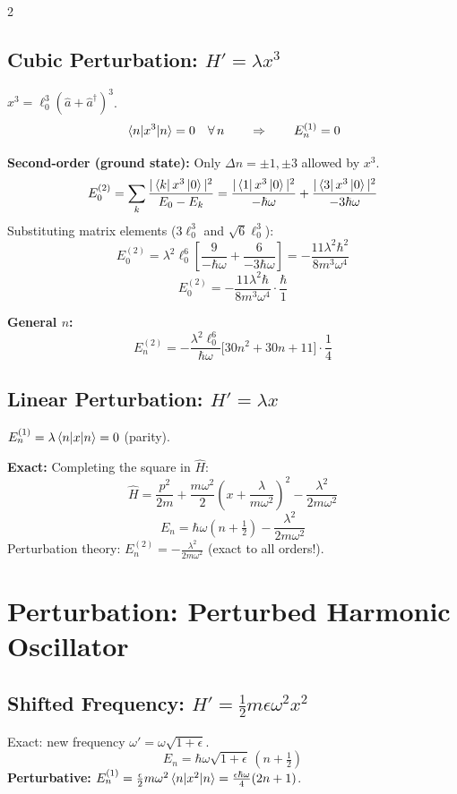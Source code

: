 \documentclass[9pt,a4paper]{article} %
\newcommand{\Hhat}{\hat{H}}
\newcommand{\aop}{\hat{a}}
\newcommand{\adop}{\hat{a}^\dagger}
\begin{document}
\begin{multicols}{2}
\subsection{Cubic Perturbation: $H' = \lambda x^3$}
$x^3 = \ell_0^3(\aop + \adop)^3$.
\[
\ev{x^3}{n} = 0 \quad\forall\,n \qquad\Rightarrow\qquad E_n^{(1)} = 0
\]

\textbf{Second-order (ground state):}
Only $\Delta n = \pm 1, \pm 3$ allowed by $x^3$.
\[
E_0^{(2)} = \sum_{k} \frac{|\bra{k}x^3\ket{0}|^2}{E_0 - E_k} = \frac{|\bra{1}x^3\ket{0}|^2}{-\hbar\omega} + \frac{|\bra{3}x^3\ket{0}|^2}{-3\hbar\omega}
\]
Substituting matrix elements ($3\ell_0^3$ and $\sqrt{6}\ell_0^3$):
\[
E_0^{(2)} = \lambda^2 \ell_0^6 \left[ \frac{9}{-\hbar\omega} + \frac{6}{-3\hbar\omega} \right] = -\frac{11\lambda^2\hbar^2}{8m^3\omega^4}
\]
\[
\boxed{E_0^{(2)} = -\frac{11\lambda^2\hbar}{8m^3\omega^4} \cdot \frac{\hbar}{1}}
\]

\textbf{General $n$:}
\[
E_n^{(2)} = -\frac{\lambda^2 \ell_0^6}{\hbar\omega}\bigl[30n^2 + 30n + 11\bigr] \cdot \frac{1}{4}
\]

\subsection{Linear Perturbation: $H' = \lambda x$}
$E_n^{(1)} = \lambda\ev{x}{n} = 0$ (parity).

\textbf{Exact:} Completing the square in $\Hhat$:
\[
\Hhat = \frac{p^2}{2m} + \frac{m\omega^2}{2}\!\left(x + \frac{\lambda}{m\omega^2}\right)^2 - \frac{\lambda^2}{2m\omega^2}
\]
\[
\boxed{E_n = \hbar\omega(n + \tfrac{1}{2}) - \frac{\lambda^2}{2m\omega^2}}
\]
Perturbation theory: $E_n^{(2)} = -\frac{\lambda^2}{2m\omega^2}$ (exact to all orders!).

\section{Perturbation: Perturbed Harmonic Oscillator}

\subsection{Shifted Frequency: $H' = \frac{1}{2}m\epsilon\omega^2 x^2$}
Exact: new frequency $\omega' = \omega\sqrt{1+\epsilon}$.
\[
E_n = \hbar\omega\sqrt{1+\epsilon}\,(n+\tfrac{1}{2})
\]
\textbf{Perturbative:}
$E_n^{(1)} = \frac{\epsilon}{2}m\omega^2\ev{x^2}{n} = \frac{\epsilon\hbar\omega}{4}(2n+1)$.


\end{multicols}
\end{document}
